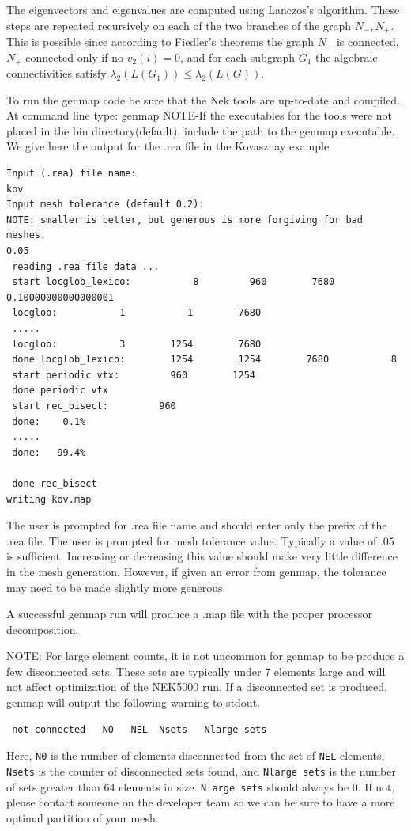 The eigenvectors and eigenvalues are computed using Lanczos's algorithm.
These steps are repeated recursively on each of the two branches of the graph $N_{-}, N_{+}$. This is possible since according to Fiedler's theorems the graph $N_{-}$ is connected, $N_{+}$ connected only if no $v_2(i)=0$,  and for each subgraph $G_1$ the algebraic connectivities satisfy $\lambda_2(L(G_1))\leq\lambda_2(L(G))$.



To run the genmap code be sure that the Nek tools are up-to-date and compiled. 
At command line type: genmap 
NOTE-If the executables for the tools were not placed in the bin directory(default), 
include the path to the genmap executable. We give here the output for the .rea file in the Kovasznay example
\begin{verbatim}
Input (.rea) file name:
kov
Input mesh tolerance (default 0.2):
NOTE: smaller is better, but generous is more forgiving for bad meshes.
0.05
 reading .rea file data ...
 start locglob_lexico:           8         960        7680  0.10000000000000001     
 locglob:           1           1        7680
 .....
 locglob:           3        1254        7680
 done locglob_lexico:        1254        1254        7680           8
 start periodic vtx:         960        1254
 done periodic vtx
 start rec_bisect:         960
 done:    0.1% 
 .....
 done:   99.4% 
  
 done rec_bisect
writing kov.map    
\end{verbatim}
The user is prompted for .rea file name and should enter only the prefix of the .rea file. 
The user is prompted for mesh tolerance value. Typically a value of .05 is sufficient. Increasing or decreasing this value should make very little difference in the mesh generation. However, if given an error from genmap, the tolerance may need to be made slightly more generous. 

A successful genmap run will produce a .map file with the proper processor decomposition.


NOTE: For large element counts, it is not uncommon for genmap to be produce a few disconnected sets.  
These sets are typically under 7 elements large and  will not affect optimization of the NEK5000 run.  
If a disconnected set is produced, genmap will output the following warning to stdout.
\begin{verbatim}
 not connected   N0   NEL  Nsets   Nlarge sets
\end{verbatim}  
Here, {\tt N0} is the number of elements disconnected from the set of {\tt NEL} elements, {\tt Nsets} is the counter of disconnected sets found, 
and {\tt Nlarge sets} is the number of sets greater than 64 elements in size.  {\tt Nlarge sets} should always be 0.  If not, please contact someone on the developer team so we can be sure to have a more optimal partition of your mesh.

